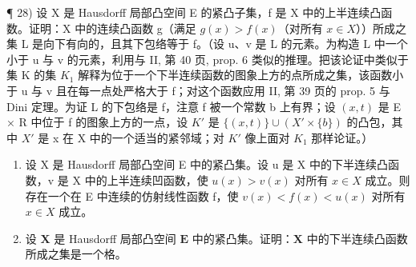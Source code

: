 ¶ 28) 设 X 是 Hausdorff 局部凸空间 E 的紧凸子集，f 是 X 中的上半连续凸函数。证明：X 中的连续凸函数 g（满足 \(g(x) > f(x)\)（对所有 \(x \in X\)））所成之集 L 是向下有向的，且其下包络等于 f。（设 u、v 是 L 的元素。为构造 L 中一个小于 u 与 v 的元素，利用与 II, 第 40 页, prop. 6 类似的推理。把该论证中类似于集 K 的集 \(K_{1}\) 解释为位于一个下半连续函数的图象上方的点所成之集，该函数小于 u 与 v 且在每一点处严格大于 f；对这个函数应用 II, 第 39 页的 prop. 5 与 Dini 定理。为证 L 的下包络是 f，注意 f 被一个常数 b 上有界；设 \((x, t)\) 是 E × R 中位于 f 的图象上方的一点，设 \(K'\) 是 \(\{(x, t)\} \cup (X' \times \{b\})\) 的凸包，其中 \(X'\) 是 x 在 X 中的一个适当的紧邻域；对 \(K'\) 像上面对 \(K_{1}\) 那样论证。）

\begin{enumerate}
\def\labelenumi{\arabic{enumi})}
\setcounter{enumi}{28}
\item
  设 X 是 Hausdorff 局部凸空间 E 中的紧凸集。设 u 是 X 中的下半连续凸函数，v 是 X 中的上半连续凹函数，使 \(u(x) > v(x)\) 对所有 \(x \in X\) 成立。则存在一个在 E 中连续的仿射线性函数 f，使 \(v(x) < f(x) < u(x)\) 对所有 \(x \in X\) 成立。
\item
  设 \(\mathbf{X}\) 是 Hausdorff 局部凸空间 \(\mathbf{E}\) 中的紧凸集。证明：\(\mathbf{X}\) 中的下半连续凸函数所成之集是一个格。
\end{enumerate}
\relax{}
